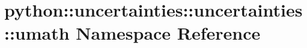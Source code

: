\hypertarget{namespacepython_1_1uncertainties_1_1uncertainties_1_1umath}{
\section{python::uncertainties::uncertainties::umath Namespace Reference}
\label{namespacepython_1_1uncertainties_1_1uncertainties_1_1umath}
}
